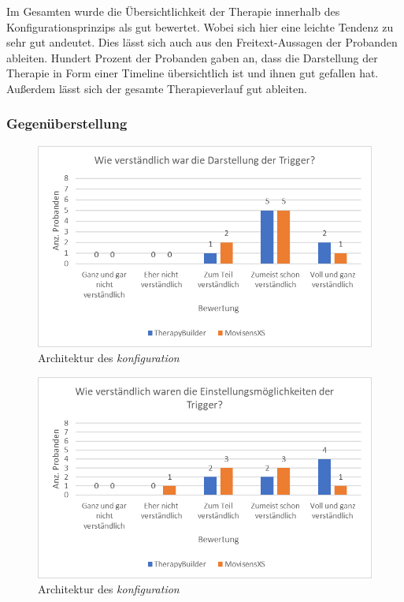 Im Gesamten wurde die Übersichtlichkeit der Therapie innerhalb des Konfigurationsprinzips als gut bewertet. Wobei sich hier eine leichte Tendenz zu sehr gut andeutet. Dies lässt sich auch aus den Freitext-Aussagen der Probanden ableiten. Hundert Prozent der Probanden gaben an, dass die Darstellung der Therapie in Form einer Timeline übersichtlich ist und ihnen gut gefallen hat. Außerdem lässt sich der gesamte Therapieverlauf gut ableiten.

\subsubsection{Gegenüberstellung}

\begin{figure}[h]
\centering
\includegraphics[width=1\textwidth]{pictures/diagramme/triggerdarstellung}
\caption{Architektur des \emph{konfiguration}}
\label{triggerdarstellung}
\end{figure}

\begin{figure}[h]
\centering
\includegraphics[width=1\textwidth]{pictures/diagramme/triggereinstellung}
\caption{Architektur des \emph{konfiguration}}
\label{triggereinstellung}
\end{figure}

